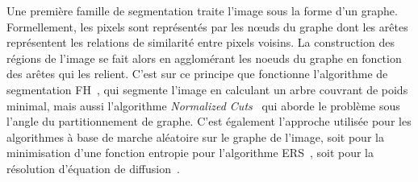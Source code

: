 Une première famille de segmentation traite l'image sous la forme d'un graphe. Formellement, les pixels sont représentés par les n\oe{}uds du graphe dont les arêtes représentent les relations de similarité entre pixels voisins. La construction des régions de l'image se fait alors en agglomérant les noeuds du graphe en fonction des arêtes qui les relient. C'est sur ce principe que fonctionne l'algorithme de segmentation \gls{FH}~\cite{felzenszwalb_efficient_2004}, qui segmente l'image en calculant un arbre couvrant de poids minimal, mais aussi l'algorithme \emph{Normalized Cuts}~\cite{shi_normalized_2000} qui aborde le problème sous l'angle du partitionnement de graphe. C'est également l'approche utilisée pour les algorithmes à base de marche aléatoire sur le graphe de l'image, soit pour la minimisation d'une fonction entropie pour l'algorithme \gls{ERS}~\cite{liu_entropy_2011}, soit pour la résolution d'équation de diffusion~\cite{grady_random_2006}.

